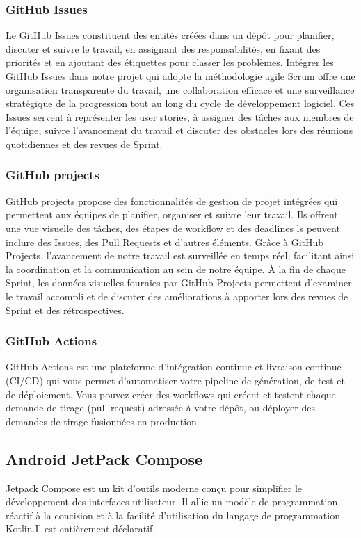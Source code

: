 \subsubsection{GitHub Issues}
Le GitHub Issues constituent des entités créées  dans un dépôt pour planifier, discuter et suivre le travail, en assignant des responsabilités, en fixant des priorités et en ajoutant des étiquettes pour classer les problèmes.
Intégrer les GitHub Issues dans notre projet qui adopte la méthodologie agile Scrum offre une organisation transparente du travail, une collaboration efficace et une surveillance stratégique de la progression tout au long du cycle de développement logiciel. Ces Issues servent à représenter les user stories, à assigner des tâches aux membres de l'équipe, suivre l'avancement du travail et discuter des obstacles lors des réunions quotidiennes et des revues de Sprint.
\cite{githubProposGitHub}
\subsubsection{GitHub projects}
GitHub projects propose des fonctionnalités de gestion de projet intégrées qui permettent aux équipes de planifier, organiser et suivre leur travail. Ils offrent une vue visuelle des tâches, des étapes de workflow et des deadlines ls peuvent inclure des Issues, des Pull Requests et d'autres éléments.
Grâce à GitHub Projects, l'avancement de notre travail est surveillée  en temps réel, facilitant ainsi la coordination et la communication au sein de notre équipe. À la fin de chaque Sprint, les données visuelles fournies par GitHub Projects permettent d'examiner le travail accompli et de discuter des améliorations à apporter lors des revues de Sprint et des rétrospectives.
\subsubsection{GitHub Actions}
GitHub Actions est une plateforme d'intégration continue et livraison continue (CI/CD) qui vous permet d'automatiser votre pipeline de génération, de test et de déploiement. Vous pouvez créer des workflows qui créent et testent chaque demande de tirage (pull request) adressée à votre dépôt, ou déployer des demandes de tirage fusionnées en production.
\cite{ComprendreGitHub}

\subsection{Android JetPack Compose}
Jetpack Compose est un kit d'outils moderne conçu pour simplifier le développement des interfaces utilisateur. Il allie un modèle de programmation réactif à la concision et à la facilité d'utilisation du langage de programmation Kotlin.Il est entièrement déclaratif.
\cite{androidPrincipesBase}

